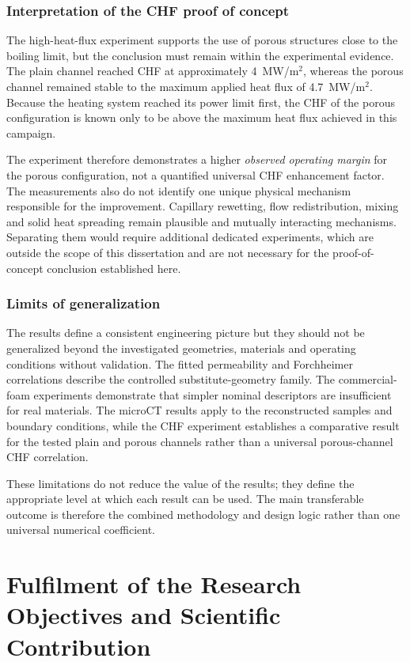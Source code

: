 \documentclass[a4paper]{article}
\begin{document}
\section{Interpretation of the CHF proof of concept}
The high-heat-flux experiment supports the use of porous structures close to the boiling limit, but the conclusion must remain within the experimental evidence. The plain channel reached CHF at approximately 4~MW/m$^2$, whereas the porous channel remained stable to the maximum applied heat flux of 4.7~MW/m$^2$. Because the heating system reached its power limit first, the CHF of the porous configuration is known only to be above the maximum heat flux achieved in this campaign.

The experiment therefore demonstrates a higher \emph{observed operating margin} for the porous configuration, not a quantified universal CHF enhancement factor. The measurements also do not identify one unique physical mechanism responsible for the improvement. Capillary rewetting, flow redistribution, mixing and solid heat spreading remain plausible and mutually interacting mechanisms. Separating them would require additional dedicated experiments, which are outside the scope of this dissertation and are not necessary for the proof-of-concept conclusion established here.

\section{Limits of generalization}
The results define a consistent engineering picture but they should not be generalized beyond the investigated geometries, materials and operating conditions without validation. The fitted permeability and Forchheimer correlations describe the controlled substitute-geometry family. The commercial-foam experiments demonstrate that simpler nominal descriptors are insufficient for real materials. The microCT results apply to the reconstructed samples and boundary conditions, while the CHF experiment establishes a comparative result for the tested plain and porous channels rather than a universal porous-channel CHF correlation.

These limitations do not reduce the value of the results; they define the appropriate level at which each result can be used. The main transferable outcome is therefore the combined methodology and design logic rather than one universal numerical coefficient.

\pagebreak
\part{Fulfilment of the Research Objectives and Scientific Contribution}
\end{document}
